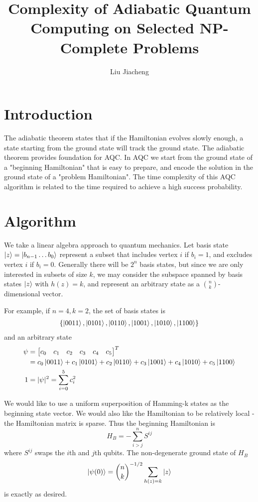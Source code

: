 \documentclass[12pt]{article}
\title{Complexity of Adiabatic Quantum Computing on Selected NP-Complete Problems}
\author{Liu Jiacheng}
\date{}
\begin{document}
\maketitle

\section{Introduction}

The adiabatic theorem states that if the Hamiltonian evolves slowly enough, a state starting from the ground state will track the ground state. The adiabatic theorem provides foundation for AQC. In AQC we start from the ground state of a "beginning Hamiltonian" that is easy to prepare, and encode the solution in the ground state of a "problem Hamiltonian". The time complexity of this AQC algorithm is related to the time required to achieve a high success probability. 

\section{Algorithm}

We take a linear algebra approach to quantum mechanics. Let basis state $\ket{z} = \ket{b_{n-1} \hdots b_0}$ represent a subset that includes vertex $i$ if $b_i = 1$, and excludes vertex $i$ if $b_i = 0$. Generally there will be $2^n$ basis states, but since we are only interested in subsets of size $k$, we may consider the subspace spanned by basis states $\ket{z}$ with $h(z)=k$, and represent an arbitrary state as a $\binom{n}{k}$-dimensional vector. 

For example, if $n = 4, k = 2$, the set of basis states is 
\begin{align*}
	\{\ket{0011}, \ket{0101}, \ket{0110}, \ket{1001}, \ket{1010}, \ket{1100}\}
\end{align*}
and an arbitrary state 
\begin{align*}
	\psi &= \begin{bmatrix} c_0 & c_1 & c_2 & c_3 & c_4 & c_5 \end{bmatrix}^T \\\
	&= c_0 \ket{0011} + c_1 \ket{0101} + c_2 \ket{0110} + c_3 \ket{1001} + c_4 \ket{1010} + c_5 \ket{1100} \\
	1 &= |\psi|^2 = \sum_{i=0}^{5}{c_i^2}
\end{align*}

We would like to use a uniform superposition of Hamming-k states as the beginning state vector. We would also like the Hamiltonian to be relatively local - the Hamiltonian matrix is sparse. Thus the beginning Hamiltonian is 
\begin{equation}
	H_B = -\sum_{i>j}^{n}{S^{ij}}
\end{equation}
where $S^{ij}$ swaps the $i$th and $j$th qubits. The non-degenerate ground state of $H_B$
\begin{equation}
	\ket{\psi(0)} = {\binom{n}{k}}^{-1/2} \sum_{h(z)=k}{\ket{z}}
\end{equation}
is exactly as desired. 
\end{document}
